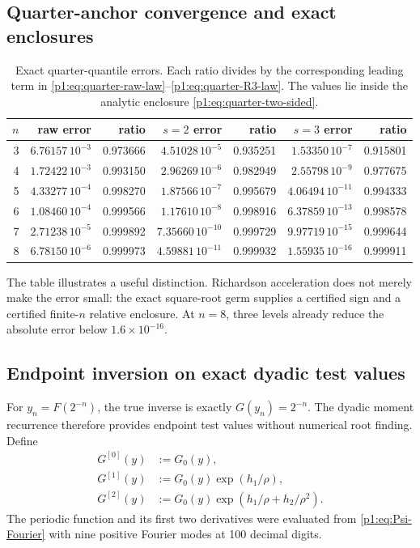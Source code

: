 \documentclass[11pt,oneside]{article}
\numberwithin{equation}{section}
\theoremstyle{definition}
\theoremstyle{remark}
\begin{document}
\subsection{Quarter-anchor convergence and exact enclosures}

\begin{table}[ht]
\centering
\small
\begin{tabular}{@{}r rr rr rr@{}}
\toprule
$n$ & raw error & ratio & $s=2$ error & ratio & $s=3$ error & ratio \\
\midrule
3 & $6.76157\,10^{-3}$ & 0.973666 & $4.51028\,10^{-5}$ & 0.935251 & $1.53350\,10^{-7}$ & 0.915801 \\
4 & $1.72422\,10^{-3}$ & 0.993150 & $2.96269\,10^{-6}$ & 0.982949 & $2.55798\,10^{-9}$ & 0.977675 \\
5 & $4.33277\,10^{-4}$ & 0.998270 & $1.87566\,10^{-7}$ & 0.995679 & $4.06494\,10^{-11}$ & 0.994333 \\
6 & $1.08460\,10^{-4}$ & 0.999566 & $1.17610\,10^{-8}$ & 0.998916 & $6.37859\,10^{-13}$ & 0.998578 \\
7 & $2.71238\,10^{-5}$ & 0.999892 & $7.35660\,10^{-10}$ & 0.999729 & $9.97719\,10^{-15}$ & 0.999644 \\
8 & $6.78150\,10^{-6}$ & 0.999973 & $4.59881\,10^{-11}$ & 0.999932 & $1.55935\,10^{-16}$ & 0.999911 \\
\bottomrule
\end{tabular}
\caption{Exact quarter-quantile errors.  Each ratio divides by the corresponding
leading term in \eqref{p1:eq:quarter-raw-law}--\eqref{p1:eq:quarter-R3-law}.  The values
lie inside the analytic enclosure \eqref{p1:eq:quarter-two-sided}.}
\label{p1:tab:quarter-errors}
\end{table}

The table illustrates a useful distinction.  Richardson acceleration does not merely make
the error small: the exact square-root germ supplies a certified sign and a certified
finite-$n$ relative enclosure.  At $n=8$, three levels already reduce the absolute error
below $1.6\times10^{-16}$.

\subsection{Endpoint inversion on exact dyadic test values}

For $y_n=F(2^{-n})$, the true inverse is exactly $G(y_n)=2^{-n}$.  The dyadic moment
recurrence therefore provides endpoint test values without numerical root finding.  Define
\begin{align}
 G^{[0]}(y)&:=G_0(y),\label{p1:eq:Gapprox0}\\
 G^{[1]}(y)&:=G_0(y)\exp(h_1/\rho),\label{p1:eq:Gapprox1}\\
 G^{[2]}(y)&:=G_0(y)\exp(h_1/\rho+h_2/\rho^2).
 \label{p1:eq:Gapprox2}
\end{align}
The periodic function and its first two derivatives were evaluated from
\eqref{p1:eq:Psi-Fourier} with nine positive Fourier modes at 100 decimal digits.
\end{document}
